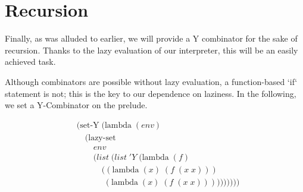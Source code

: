 \section{Recursion}
Finally, as was alluded to earlier, we will provide a Y combinator for the sake of recursion. Thanks to the lazy evaluation of our interpreter, this will be an easily achieved task.

Although combinators are possible without lazy evaluation, a function-based `if` statement is not; this is the key to our dependence on laziness. In the following, we set a Y-Combinator on the prelude.

\begin{align*}
& (\text{set-Y} \; (\text{lambda} \; (env)
\\& \quad (\text{lazy-set}
\\& \qquad env
\\& \qquad (list \; (list \; 'Y \; (\text{lambda} \; (f) \; 
\\& \qquad \quad ((\text{lambda} \; (x) \; (f \; (x \; x))) \; 
\\& \qquad \quad \; (\text{lambda} \; (x) \; (f \; (x \; x))))))))))
\end{align*}
